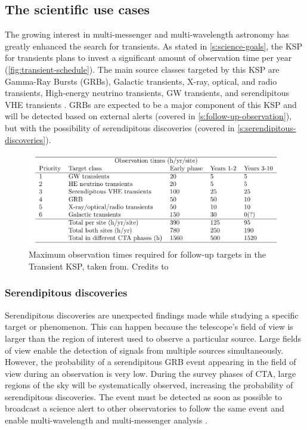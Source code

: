 \subsection{The scientific use cases}
\label{s:contribution-1-use-cases}
The growing interest in multi-messenger and multi-wavelength astronomy has greatly enhanced the search for transients. As stated in \autoref{s:science-goals}, the KSP for transients plans to invest a significant amount of observation time per year (\autoref{fig:transient-schedule}). The main source classes targeted by this KSP are Gamma-Ray Bursts (GRBs), Galactic transients, X-ray, optical, and radio transients, High-energy neutrino transients, GW transients, and serendipitous VHE transients \cite{ScienceWithCherenkovTelescopeArray2018}. GRBs are expected to be a major component of this KSP and will be detected based on external alerts (covered in \autoref{s:follow-up-observation}), but with the possibility of serendipitous discoveries (covered in \autoref{s:serendipitous-discoveries}).
\begin{figure}[t]
\centering
\includegraphics[width=0.9\linewidth]{figures/introduction/transients-schedule.png}
\caption{Maximum observation times required for follow-up targets in the Transient KSP, taken from. Credits to \cite{di2020detection}}
\label{fig:transient-schedule}
\end{figure}

\subsubsection{Serendipitous discoveries}
\label{s:serendipitous-discoveries}
Serendipitous discoveries are unexpected findings made while studying a specific target or phenomenon. This can happen because the telescope's field of view is larger than the region of interest used to observe a particular source. Large fields of view enable the detection of signals from multiple sources simultaneously. However, the probability of a serendipitous GRB event appearing in the field of view during an observation is very low. During the survey phases of CTA, large regions of the sky will be systematically observed, increasing the probability of serendipitous discoveries. The event must be detected as soon as possible to broadcast a science alert to other observatories to follow the same event and enable multi-wavelength and multi-messenger analysis \cite{bulgarelli2015on}. 

